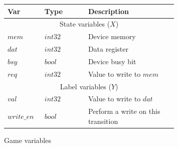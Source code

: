 \begin{figure}
    \centering
    \caption{Game variables}
    \label{fig:ex_game_variables}
    \begin{tabular}{|p{0.13\linewidth}p{0.22\linewidth}p{0.45\linewidth}|}
        \hline
        {\bf Var} & {\bf Type} & {\bf Description} \\
        \hline\hline
        \multicolumn{3}{|c|}{State variables ($X$)} \\
        \hline
        $mem$ & $int32$ & Device memory           \\
        $dat$ & $int32$ & Data register           \\
        $bsy$ & $bool$  & Device busy bit         \\
        $req$ & $int32$ & Value to write to $mem$ \\
        \hline\hline
        \multicolumn{3}{|c|}{Label variables ($Y$)}    \\
        \hline
        $val$       & $int32$ & Value to write to $dat$ \\
        $write\_en$ & $bool$  & Perform a write on this transition \\
        \hline
    \end{tabular}
\end{figure}

